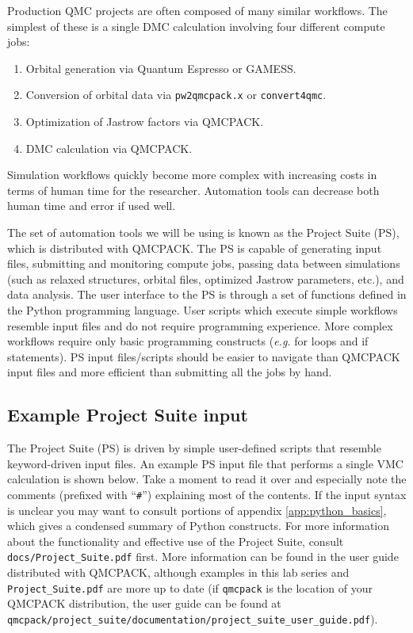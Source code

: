 Production QMC projects are often composed of many similar workflows.  The simplest of these is a single DMC calculation involving four different compute jobs:
\begin{enumerate}
  \item{Orbital generation via Quantum Espresso or GAMESS.}
  \item{Conversion of orbital data via \texttt{pw2qmcpack.x} or \texttt{convert4qmc}.}
  \item{Optimization of Jastrow factors via QMCPACK.}
  \item{DMC calculation via QMCPACK.}
\end{enumerate}
Simulation workflows quickly become more complex with increasing costs in terms of human time for the researcher.  Automation tools can decrease both human time and error if used well.

The set of automation tools we will be using is known as the Project Suite (PS), which is distributed with QMCPACK.  The PS is capable of generating input files, submitting and monitoring compute jobs, passing data between simulations (such as relaxed structures, orbital files, optimized Jastrow parameters, etc.), and data analysis.  The user interface to the PS is through a set of functions defined in the Python programming language.  User scripts which execute simple workflows resemble input files and do not require programming experience.  More complex workflows require only basic programming constructs (\emph{e.g.} for loops and if statements).  PS input files/scripts should be easier to navigate than QMCPACK input files and more efficient than submitting all the jobs by hand.


\subsection{Example Project Suite input}
The Project Suite (PS) is driven by simple user-defined scripts that resemble keyword-driven input files.  An example PS input file that performs a single VMC calculation is shown below.  Take a moment to read it over and especially note the comments (prefixed with ``\texttt{\#}'') explaining most of the contents.  If the input syntax is unclear you may want to consult portions of appendix \ref{app:python_basics}, which gives a condensed summary of Python constructs.  For more information about the functionality and effective use of the Project Suite, consult \texttt{docs/Project\_Suite.pdf} first.  More information can be found in the user guide distributed with QMCPACK, although examples in this lab series and \texttt{Project\_Suite.pdf} are more up to date (if \texttt{qmcpack} is the location of your QMCPACK distribution, the user guide can be found at \texttt{qmcpack/project\_suite/documentation/project\_suite\_user\_guide.pdf}).

